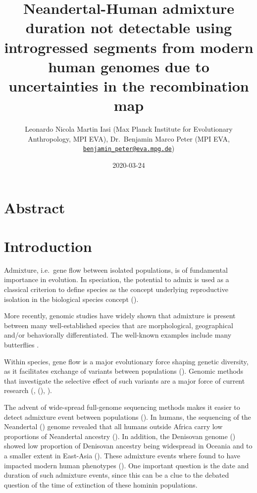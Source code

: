 \documentclass[]{article}
\title{Neandertal-Human admixture duration not detectable using introgressed
segments from modern human genomes due to uncertainties in the
recombination map}
\author{Leonardo Nicola Martin Iasi (Max Planck Institute for Evolutionary
Anthropology, MPI EVA), Dr.~Benjamin Marco Peter (MPI EVA,
\href{mailto:benjamin_peter@eva.mpg.de}{\nolinkurl{benjamin\_peter@eva.mpg.de}})}
\date{2020-03-24}
\begin{document}
\maketitle

\section{Abstract}\label{abstract}

\section{Introduction}\label{introduction}

Admixture, i.e.~gene flow between isolated populations,
 is of fundamental importance in evolution. In 
speciation, the  
potential to admix is used as a classical criterion to define  species as the concept underlying  reproductive
isolation in the biological species concept (\cite{mayr_animal_1963}).

More recently, genomic studies have widely shown that admixture is present between many well-established species that are morphological, geographical and/or behaviorally differentiated. The well-known examples include many butterflies \cite{Salazar_Hybrid_speciation_2010, rieseberg_hybridization_2007,kronforst_multilocus_2006,kolbe_multiple_2007}. 

Within species, gene flow is a major evolutionary force  shaping genetic diversity, as it facilitates exchange of variants between populations
(\cite{harrison_hybridization_2014}). Genomic methods that investigate the selective effect of such variants  are a major force of current research (\cite{hedrick_adaptive_2013},
(\cite{shaw_genes_2011}), \cite{payseur_using_2010}).

The advent of wide-spread full-genome sequencing methods makes it easier to detect admixture event
between populations (\cite{sousa_understanding_2013}). In humans, the sequencing of
the Neandertal (\cite{green_draft_2010}) genome revealed that all humans outside Africa carry low proportions of Neandertal ancestry
(\cite{green_draft_2010,prufer_complete_2013,vernot_resurrecting_2014,fu_early_2015,fu_genome_2014,sankararaman_genomic_2014,prufer_high-coverage_2017}). In addition, the  Denisovan genome (\cite{reich_genetic_2010})
showed low proportion of Denisovan ancestry being widespread in Oceania and to a smaller extent in East-Asia
(\cite{reich_genetic_2010,meyer_high-coverage_2012,sankararaman_combined_2016,vernot_excavating_2016}).
These admixture events where found to have impacted modern human
phenotypes (\cite{dannemann_something_2018}). One important question is
the date and duration of such admixture events, since this can be a clue
to the debated question of the time of extinction of these hominin
populations.
\end{document}
